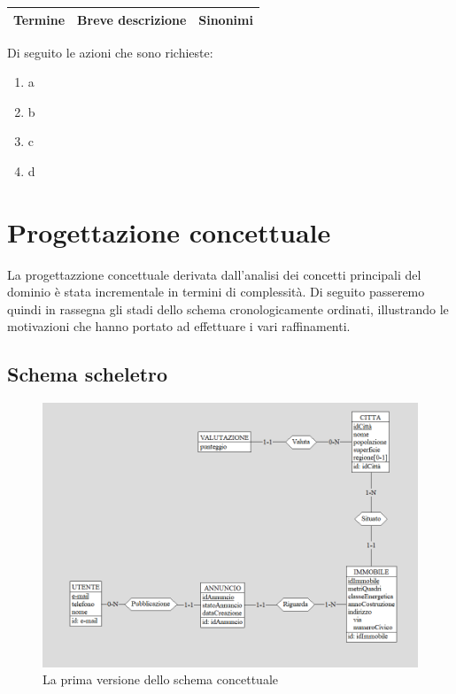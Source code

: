 \documentclass[a4paper,12pt]{report}
\begin{document}
            \begin{center}
                 \begin{tabular}{|c c c|} 
                     \hline
                     Termine & Breve descrizione & Sinonimi \\ [0.5ex] 
                     \hline
                \end{tabular}
            \end{center}
            
            Di seguito le azioni che sono richieste:
            
            \begin{enumerate}
              \item a
              \item b
              \item c
              \item d
              
            \end{enumerate}


	\chapter*{Progettazione concettuale}
        La progettazzione concettuale derivata dall'analisi dei concetti principali del dominio
        è stata incrementale in termini di complessità. Di seguito passeremo quindi in rassegna
        gli stadi dello schema cronologicamente ordinati, illustrando le motivazioni che hanno 
        portato ad effettuare i vari raffinamenti.

    	\section*{Schema scheletro}
        \begin{figure}
            \includegraphics[width=\linewidth]{./images/first.png}
            \caption{La prima versione dello schema concettuale}
        \end{figure}
        
\end{document}
